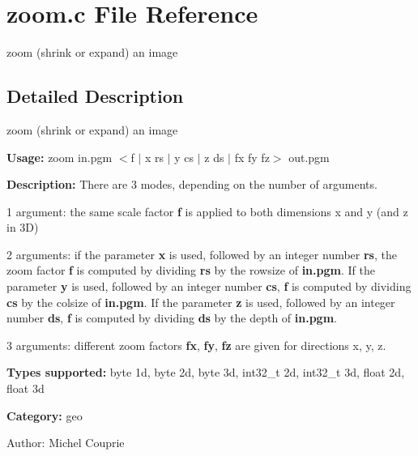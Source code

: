 \section{zoom.c File Reference}
\label{zoom_8c}
zoom (shrink or expand) an image  




\label{_details}
\subsection{Detailed Description}
zoom (shrink or expand) an image 

{\bf Usage:} zoom in.pgm $<$f $|$ x rs $|$ y cs $|$ z ds $|$ fx fy fz$>$ out.pgm

{\bf Description:} There are 3 modes, depending on the number of arguments.

1 argument: the same scale factor {\bf f} is applied to both dimensions x and y (and z in 3D)

2 arguments: if the parameter {\bf x} is used, followed by an integer number {\bf rs}, the zoom factor {\bf f} is computed by dividing {\bf rs} by the rowsize of {\bf in.pgm}. If the parameter {\bf y} is used, followed by an integer number {\bf cs}, {\bf f} is computed by dividing {\bf cs} by the colsize of {\bf in.pgm}. If the parameter {\bf z} is used, followed by an integer number {\bf ds}, {\bf f} is computed by dividing {\bf ds} by the depth of {\bf in.pgm}.

3 arguments: different zoom factors {\bf fx}, {\bf fy}, {\bf fz} are given for directions x, y, z.

{\bf Types supported:} byte 1d, byte 2d, byte 3d, int32\_\-t 2d, int32\_\-t 3d, float 2d, float 3d

{\bf Category:} geo

\begin{Desc}
\item[Author:]Michel Couprie \end{Desc}
